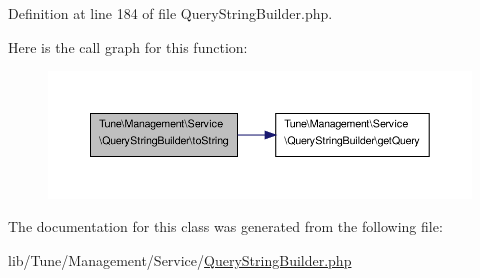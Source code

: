 Definition at line 184 of file Query\-String\-Builder.\-php.




Here is the call graph for this function\-:
\nopagebreak
\begin{figure}[H]
\begin{center}
\leavevmode
\includegraphics[width=350pt]{classTune_1_1Management_1_1Service_1_1QueryStringBuilder_a74ffb882dd3a710fc2fc8cf7f715c5ed_cgraph}
\end{center}
\end{figure}




The documentation for this class was generated from the following file\-:\begin{DoxyCompactItemize}
\item 
lib/\-Tune/\-Management/\-Service/\hyperlink{QueryStringBuilder_8php}{Query\-String\-Builder.\-php}\end{DoxyCompactItemize}
